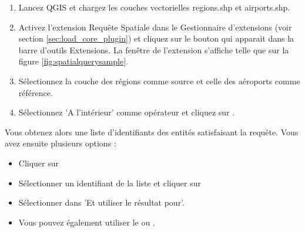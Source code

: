 \begin{enumerate}
  \item Lancez QGIS et chargez les couches vectorielles regions.shp et airports.shp.
  \item Activez l'extension Requête Spatiale dans le Gestionnaire d'extensions (voir section \ref{sec:load_core_plugin}) et cliquez sur le bouton  qui apparait dans la barre d'outils Extensions. La fenêtre de l'extension s'affiche telle que sur la figure \ref{fig:spatialquerysample}.
  \item Sélectionnez la couche des régions comme source et celle des aéroports comme référence.
  \item Sélectionnez 'A l'intérieur' comme opérateur et cliquez sur .
\end{enumerate}

Vous obtenez alors une liste d'identifiants des entités satisfaisant la requête. Vous avez ensuite plusieurs options :

\begin{itemize}[label=--]
\item Cliquer sur 
\item Sélectionner un identifiant de la liste et cliquer sur 
\item Sélectionner  dans 'Et utiliser le résultat pour'.
\item Vous pouvez également utiliser le  ou .
\end{itemize}

